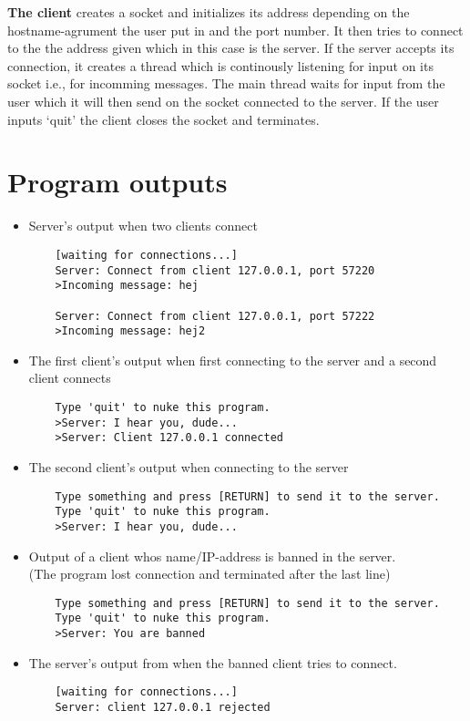 \documentclass{article}
\begin{document}
\textbf{The client} creates a socket and initializes its address depending on the hostname-agrument the user put in and the port number. It then tries to connect to the the address given which in this case is the server. If the server accepts its connection, it creates a thread which is continously listening for input on its socket i.e., for incomming messages. The main thread waits for input from the user which it will then send on the socket connected to the server. If the user inputs `quit' the client closes the socket and terminates.

\onecolumn
\section{Program outputs}
\begin{itemize}
    \item Server's output when two clients connect
    \begin{verbatim}
    [waiting for connections...]
    Server: Connect from client 127.0.0.1, port 57220
    >Incoming message: hej

    Server: Connect from client 127.0.0.1, port 57222
    >Incoming message: hej2
    \end{verbatim}
\item The first client's output when first connecting to the server and a second client connects
    \begin{verbatim}
    Type 'quit' to nuke this program.
    >Server: I hear you, dude...
    >Server: Client 127.0.0.1 connected
    \end{verbatim}

\item The second client's output when connecting to the server
    \begin{verbatim}
    Type something and press [RETURN] to send it to the server.
    Type 'quit' to nuke this program.
    >Server: I hear you, dude...
    \end{verbatim}

\item Output of a client whos name/IP-address is banned in the server.\\(The program lost connection and terminated after the last line)
    \begin{verbatim}
    Type something and press [RETURN] to send it to the server.
    Type 'quit' to nuke this program.
    >Server: You are banned
    \end{verbatim}

\item The server's output from when the banned client tries to connect.
    \begin{verbatim}
    [waiting for connections...]
    Server: client 127.0.0.1 rejected
    \end{verbatim}
\end{itemize}
\end{document}
